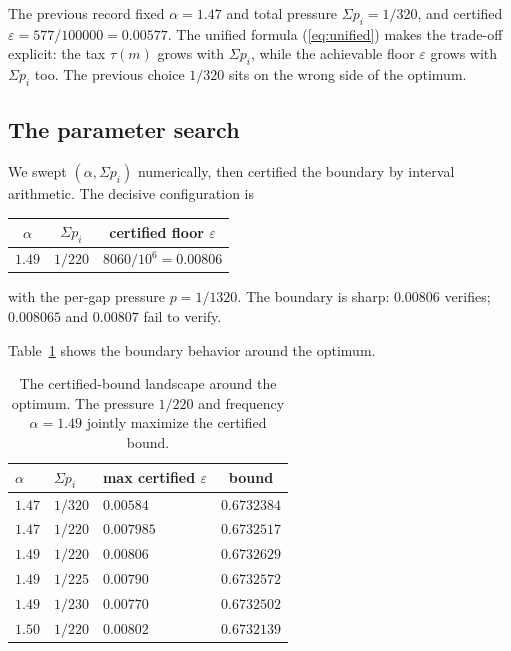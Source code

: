 \documentclass[11pt]{article}
\newcommand{\eps}{\varepsilon}
\begin{document}
The previous record \cite{tawanerguo} fixed $\alpha=1.47$ and total pressure
$\Sigma p_i = 1/320$, and certified $\eps = 577/100000 = 0.00577$.  The
unified formula (\ref{eq:unified}) makes the trade-off explicit: the tax
$\tau(m)$ grows with $\Sigma p_i$, while the achievable floor $\eps$ grows
with $\Sigma p_i$ too.  The previous choice $1/320$ sits on the wrong side of
the optimum.

\subsection{The parameter search}
\label{sec:search}

We swept $(\alpha,\Sigma p_i)$ numerically, then certified the boundary by
interval arithmetic.  The decisive configuration is
\begin{center}
\begin{tabular}{ccc}
\toprule
$\alpha$ & $\Sigma p_i$ & certified floor $\eps$ \\
\midrule
$1.49$ & $1/220$ & $8060/10^6 = 0.00806$ \\
\bottomrule
\end{tabular}
\end{center}
with the per-gap pressure $p=1/1320$.  The boundary is sharp:
$0.00806$ verifies; $0.008065$ and $0.00807$ fail to verify.

Table~\ref{tab:search} shows the boundary behavior around the optimum.

\begin{table}[ht]
\centering
\begin{tabular}{lllc}
\toprule
$\alpha$ & $\Sigma p_i$ & max certified $\eps$ & bound \\
\midrule
$1.47$ & $1/320$ & $0.00584$ & $0.6732384$ \\
$1.47$ & $1/220$ & $0.007985$ & $0.6732517$ \\
$1.49$ & $1/220$ & $\mathbf{0.00806}$ & $\mathbf{0.6732629}$ \\
$1.49$ & $1/225$ & $0.00790$ & $0.6732572$ \\
$1.49$ & $1/230$ & $0.00770$ & $0.6732502$ \\
$1.50$ & $1/220$ & $0.00802$ & $0.6732139$ \\
\bottomrule
\end{tabular}
\caption{The certified-bound landscape around the optimum.  The pressure
$1/220$ and frequency $\alpha=1.49$ jointly maximize the certified bound.}
\label{tab:search}
\end{table}
\end{document}
